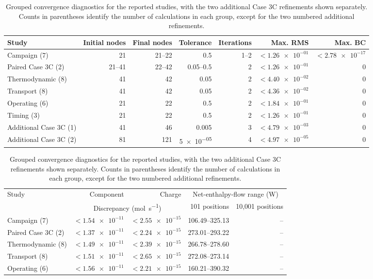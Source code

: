 \begin{table}[pos=t]
\centering\footnotesize
\caption{Grouped convergence diagnostics for the reported studies, with the two additional Case 3C refinements shown separately. Counts in parentheses identify the number of calculations in each group, except for the two numbered additional refinements.}
\label{tab:run-diagnostics}
\setlength{\tabcolsep}{4pt}
\begin{tabularx}{\textwidth}{@{}Xrrrrrr@{}}
\toprule
Study & Initial nodes & Final nodes & Tolerance & Iterations & Max. RMS & Max. BC \\
\midrule
Campaign (7) & 21 & 21--22 & \num{0.5} & 1--2 & $<\num{1.26e-01}$ & $<\num{2.78e-17}$ \\
Paired Case 3C (2) & 21--41 & 22--42 & \num{0.05}--\num{0.5} & 2 & $<\num{1.26e-01}$ & 0 \\
Thermodynamic (8) & 41 & 42 & \num{0.05} & 2 & $<\num{4.40e-02}$ & 0 \\
Transport (8) & 41 & 42 & \num{0.05} & 2 & $<\num{4.36e-02}$ & 0 \\
Operating (6) & 21 & 22 & \num{0.5} & 2 & $<\num{1.84e-01}$ & 0 \\
Timing (3) & 21 & 22 & \num{0.5} & 2 & $<\num{1.26e-01}$ & 0 \\
Additional Case 3C (1) & 41 & 46 & \num{0.005} & 3 & $<\num{4.79e-03}$ & 0 \\
Additional Case 3C (2) & 81 & 121 & \num{5e-05} & 4 & $<\num{4.97e-05}$ & 0 \\
\bottomrule
\end{tabularx}
\par\medskip
\begin{tabularx}{\textwidth}{@{}Xrrrr@{}}
\toprule
Study & Component & Charge & \multicolumn{2}{c}{Net-enthalpy-flow range (\unit{W})} \\
 & \multicolumn{2}{c}{Discrepancy (\unit{mol.s^{-1}})} & 101 positions & 10,001 positions \\
\midrule
Campaign (7) & $<\num{1.54e-11}$ & $<\num{2.55e-15}$ & 106.49--325.13 & -- \\
Paired Case 3C (2) & $<\num{1.37e-11}$ & $<\num{2.24e-15}$ & 273.01--293.22 & -- \\
Thermodynamic (8) & $<\num{1.49e-11}$ & $<\num{2.39e-15}$ & 266.78--278.60 & -- \\
Transport (8) & $<\num{1.51e-11}$ & $<\num{2.65e-15}$ & 272.08--273.14 & -- \\
Operating (6) & $<\num{1.56e-11}$ & $<\num{2.21e-15}$ & 160.21--390.32 & -- \\

\end{tabularx}
\end{table}
